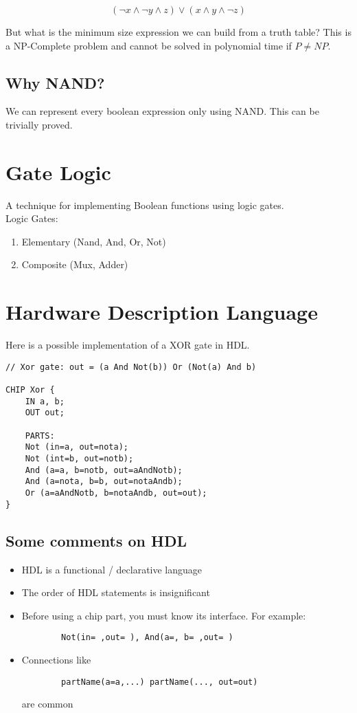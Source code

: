 $$
(\neg x \land \neg y \land z) \lor (x \land y \land \neg z)
$$

But what is the minimum size expression we can build from a truth
table? This is a NP-Complete problem and cannot be solved in
polynomial time if $P \neq NP$.\\

\subsection{Why NAND?}
We can represent every boolean expression only using NAND. This
can be trivially proved.

\section{Gate Logic}

A technique for implementing Boolean functions using logic gates.\\

Logic Gates:
\begin{enumerate}
    \item Elementary (Nand, And, Or, Not)
    \item Composite (Mux, Adder)
\end{enumerate}

\section{Hardware Description Language}

Here is a possible implementation of a XOR gate in HDL.

\begin{lstlisting}
// Xor gate: out = (a And Not(b)) Or (Not(a) And b)

CHIP Xor {
    IN a, b;
    OUT out;

    PARTS:
    Not (in=a, out=nota);
    Not (int=b, out=notb);
    And (a=a, b=notb, out=aAndNotb);
    And (a=nota, b=b, out=notaAndb);
    Or (a=aAndNotb, b=notaAndb, out=out);
}
\end{lstlisting}

\subsection{Some comments on HDL}

\begin{itemize}
    \item HDL is a functional / declarative language
    \item The order of HDL statements is insignificant
    \item Before using a chip part, you must know its interface.
        For example: 
        \begin{lstlisting}
        Not(in= ,out= ), And(a=, b= ,out= )
        \end{lstlisting}
    \item Connections like
        \begin{lstlisting}
        partName(a=a,...) partName(..., out=out)
        \end{lstlisting}
        are common
\end{itemize}


